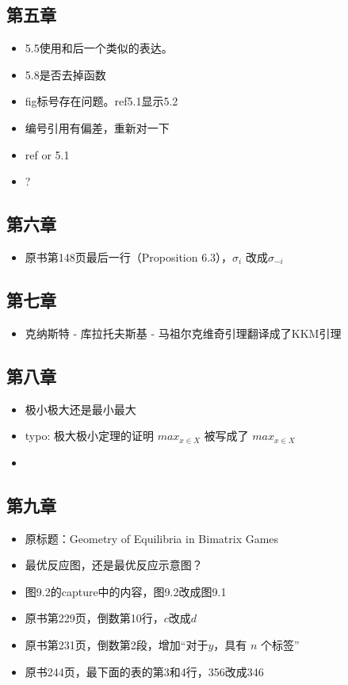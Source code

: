 \subsection{第五章}
\begin{itemize}
    \item 5.5使用和后一个类似的表达。
    \item 5.8是否去掉函数
    \item fig标号存在问题。ref5.1显示5.2
    \item 编号引用有偏差，重新对一下
    \item ref or 5.1
    \item \textbf{}? 
    
\end{itemize}

\subsection{第六章}
\begin{itemize}
    \item 原书第148页最后一行（Proposition 6.3），$\sigma_i$ 改成$\sigma_{-i}$
\end{itemize}

\subsection{第七章}

\begin{itemize}
    \item 克纳斯特 - 库拉托夫斯基 - 马祖尔克维奇引理翻译成了KKM引理
\end{itemize}

\subsection{第八章}

\begin{itemize}
    \item 极小极大还是最小最大
    \item typo: 极大极小定理的证明 $max_{x\in X}$ 被写成了 $max_{x\in X}$
    \item 
    \end{itemize}

\subsection{第九章}
\begin{itemize}
    \item 原标题：Geometry of Equilibria in Bimatrix Games
    \item 最优反应图，还是最优反应示意图？
    
    \item 图9.2的capture中的内容，图9.2改成图9.1
    \item 原书第229页，倒数第10行，$c$改成$d$
        \item 原书第231页，倒数第2段，增加“对于\(y\)，具有 \(n\) 个标签”
    \item 原书244页，最下面的表的第3和4行，356改成346
\end{itemize}

